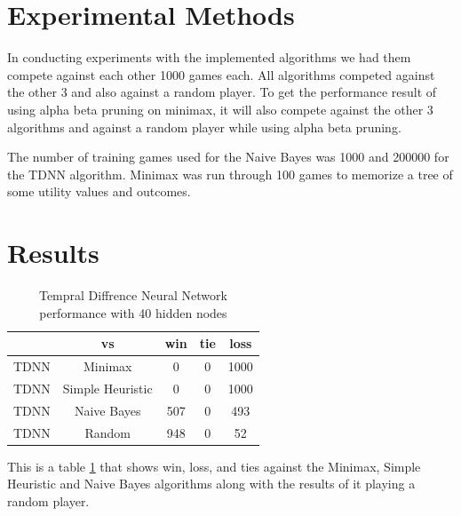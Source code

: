 \documentclass[12pt,letterpaper]{article}
\begin{document}
\section{Experimental Methods}
In conducting experiments with the implemented algorithms we had them compete against each other 1000 games each. All algorithms competed against the other 3 and also against a random player. To get the performance result of using alpha beta pruning on minimax, it will also compete against the other 3 algorithms and against a random player while using alpha beta pruning.

The number of training games used for the Naive Bayes was 1000 and 200000 for the TDNN algorithm. Minimax was run through 100 games to memorize a tree of some utility values and outcomes. 


\clearpage
\newpage

\section{Results}

\begin{table}[h]
\begin{center}
\begin{tabular}{|c||c|c|c|c|}
\hline
& vs & win & tie & loss\\
\hline \hline
TDNN & Minimax & 0 & 0 & 1000\\
\hline 
TDNN & Simple Heuristic & 0 & 0 & 1000\\
\hline 
TDNN & Naive Bayes & 507 & 0 & 493\\
\hline 
TDNN & Random & 948 & 0 & 52\\
\hline 
\end{tabular}
\end{center}
\caption{Tempral Diffrence Neural Network performance with 40 hidden nodes}
\label{TDNNtable}
\end{table}

This is a table \ref{TDNNtable} that shows win, loss, and ties against the Minimax, Simple Heuristic and Naive Bayes algorithms along with the results of it playing a random player.
\end{document}
